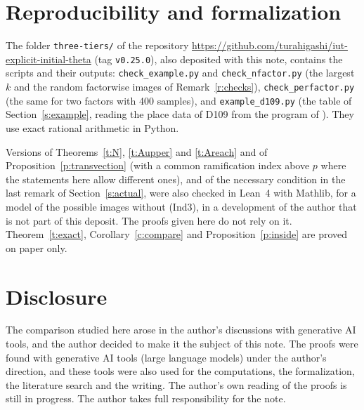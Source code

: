 \documentclass[11pt,a4paper]{article}
\theoremstyle{plain}
\theoremstyle{definition}
\theoremstyle{remark}
\begin{document}
\section{Reproducibility and formalization}
The folder \texttt{three-tiers/} of the repository \url{https://github.com/turahigashi/iut-explicit-initial-theta}
(tag \texttt{v0.25.0}), also deposited with this note, contains the scripts and their outputs:
\texttt{check\_example.py} and \texttt{check\_nfactor.py} (the largest $k$ and the random factorwise images of
Remark~\ref{r:checks}), \texttt{check\_perfactor.py} (the same for two factors with 400 samples), and
\texttt{example\_d109.py} (the table of Section~\ref{s:example}, reading the place data of D109 from the program of
\cite{Walk}). They use exact rational arithmetic in Python.

Versions of Theorems~\ref{t:N}, \ref{t:Aupper} and \ref{t:Areach} and of Proposition~\ref{p:transvection} (with a
common ramification index above $p$ where the statements here allow different ones), and of the necessary condition in
the last remark of Section~\ref{s:actual}, were also checked in Lean~4 with Mathlib, for a model of the possible images
without (Ind3), in a development of the author that is not part of this deposit. The proofs given here do not rely on
it. Theorem~\ref{t:exact}, Corollary~\ref{c:compare} and Proposition~\ref{p:inside} are proved on paper only.

\section*{Disclosure}
The comparison studied here arose in the author's discussions with generative AI tools, and the author decided to make
it the subject of this note. The proofs were found with generative AI tools (large language models) under the author's
direction, and these tools were also used for the computations, the formalization, the literature search and the
writing. The author's own reading of the proofs is still in progress. The author takes full responsibility for the
note.
\end{document}

